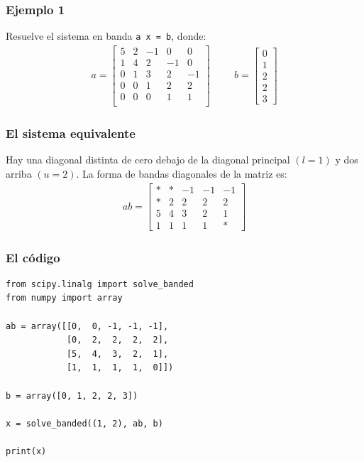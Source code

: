 \documentclass[12pt]{beamer}
\begin{document}
\begin{frame}
\frametitle{Ejemplo 1}
Resuelve el sistema en banda \texttt{a x =  b}, donde:
\pause
\renewcommand{\arraystretch}{0.9}
\begin{align*}
a = \begin{bmatrix}
5 & 2 & -1 & 0 & 0 \\
1 & 4 & 2 & -1 & 0 \\
0 & 1 & 3 & 2 & -1 \\
0 & 0 & 1 & 2 & 2 \\
0 & 0 & 0 & 1 & 1 \\
\end{bmatrix}
\hspace{1cm}
b = 
\begin{bmatrix}
0 \\
1 \\
2 \\
2 \\
3
\end{bmatrix}
\end{align*}
\end{frame}
\begin{frame}
\frametitle{El sistema equivalente}
Hay una diagonal distinta de cero debajo de la diagonal principal $(l = 1)$ y dos arriba $(u = 2)$. La forma de bandas diagonales de la matriz es:
\pause
\begin{align*}
ab = 
\begin{bmatrix}
* & * & -1 & -1 & -1 \\
* & 2 & 2 & 2 & 2 \\
5 & 4 & 3 & 2 & 1 \\
1 & 1 & 1 & 1 & *
\end{bmatrix}
\end{align*}
\end{frame}
\begin{frame}
\frametitle{El código}
\begin{lstlisting}[caption=Código para resolver un sistema matricial en banda]
from scipy.linalg import solve_banded
from numpy import array

ab = array([[0,  0, -1, -1, -1],
            [0,  2,  2,  2,  2],
            [5,  4,  3,  2,  1],
            [1,  1,  1,  1,  0]])

b = array([0, 1, 2, 2, 3])

x = solve_banded((1, 2), ab, b)

print(x)
\end{lstlisting}
\end{frame}
\end{document}
